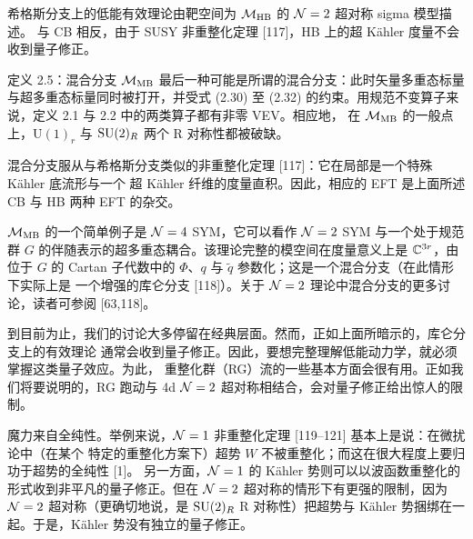 希格斯分支上的低能有效理论由靶空间为 $\mathcal{M}_{\mathrm{HB}}$ 的 $\mathcal{N}=2$ 超对称 sigma 模型描述。
与 CB 相反，由于 SUSY 非重整化定理 [117]，HB 上的超 Kähler 度量不会收到量子修正。

\begin{definitionbox}{定义 2.5：混合分支 $\mathcal{M}_{\mathrm{MB}}$}
  最后一种可能是所谓的混合分支：此时矢量多重态标量与超多重态标量同时被打开，并受式 (2.30)
  至 (2.32) 的约束。用规范不变算子来说，定义 2.1 与 2.2 中的两类算子都有非零 VEV。相应地，
  在 $\mathcal{M}_{\mathrm{MB}}$ 的一般点上，$\mathrm{U}(1)_r$ 与 $\mathrm{SU}(2)_R$ 两个 R 对称性都被破缺。
\end{definitionbox}

混合分支服从与希格斯分支类似的非重整化定理 [117]：它在局部是一个特殊 Kähler 底流形与一个
超 Kähler 纤维的度量直积。因此，相应的 EFT 是上面所述 CB 与 HB 两种 EFT 的杂交。

$\mathcal{M}_{\mathrm{MB}}$ 的一个简单例子是 $\mathcal{N}=4$ SYM，它可以看作 $\mathcal{N}=2$ SYM 与一个处于规范群
$G$ 的伴随表示的超多重态耦合。该理论完整的模空间在度量意义上是 $\mathbb{C}^{3r}$，由位于 $G$ 的
Cartan 子代数中的 $\Phi$、$q$ 与 $\tilde q$ 参数化；这是一个混合分支（在此情形下实际上是
一个增强的库仑分支 [118]）。关于 $\mathcal{N}=2$ 理论中混合分支的更多讨论，读者可参阅 [63,118]。



到目前为止，我们的讨论大多停留在经典层面。然而，正如上面所暗示的，库仑分支上的有效理论
通常会收到量子修正。因此，要想完整理解低能动力学，就必须掌握这类量子效应。为此，
重整化群（RG）流的一些基本方面会很有用。正如我们将要说明的，RG 跑动与 4d $\mathcal{N}=2$
超对称相结合，会对量子修正给出惊人的限制。

魔力来自全纯性。举例来说，$\mathcal{N}=1$ 非重整化定理 [119--121] 基本上是说：在微扰论中（在某个
特定的重整化方案下）超势 $W$ 不被重整化；而这在很大程度上要归功于超势的全纯性 [1]。
另一方面，$\mathcal{N}=1$ 的 Kähler 势则可以以波函数重整化的形式收到非平凡的量子修正。但在
$\mathcal{N}=2$ 超对称的情形下有更强的限制，因为 $\mathcal{N}=2$ 超对称（更确切地说，是 $\mathrm{SU}(2)_R$
R 对称性）把超势与 Kähler 势捆绑在一起。于是，Kähler 势没有独立的量子修正。

